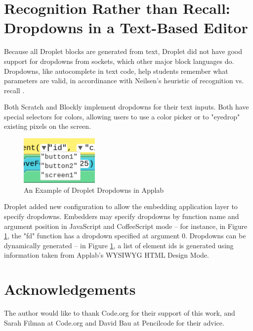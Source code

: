 \documentclass[conference]{IEEEtran}
\begin{document}
\section{Recognition Rather than Recall: Dropdowns in a Text-Based Editor}

Because all Droplet blocks are generated from text, Droplet did not have good support for dropdowns from sockets, which other major block languages do. Dropdowns, like autocomplete in text code, help students remember what parameters are valid, in accordinance with Neilsen's heuristic of recognition vs. recall \cite{Neilsen}.

Both Scratch and Blockly implement dropdowns for their text inputs. Both have special selectors for colors, allowing users to use a color picker or to "eyedrop" existing pixels on the screen.

\begin{figure}
\centering
\includegraphics[width=1.5in]{dropdowns.png}
\caption{An Example of Droplet Dropdowns in Applab}
\label{dropdowns}
\end{figure}

Droplet added new configuration to allow the embedding application layer to specify dropdowns. Embedders may specify dropdowns by function name and argument position in JavaScript and CoffeeScript mode -- for instance, in Figure \ref{dropdowns}, the "fd" function has a dropdown specified at argument 0. Dropdowns can be dynamically generated -- in Figure \ref{dropdowns}, a list of element ids is generated using information taken from Applab's WYSIWYG HTML Design Mode.

\section{Acknowledgements}

The author would like to thank Code.org for their support of this work, and Sarah Filman at Code.org and David Bau at Pencilcode for their advice.
\end{document}
